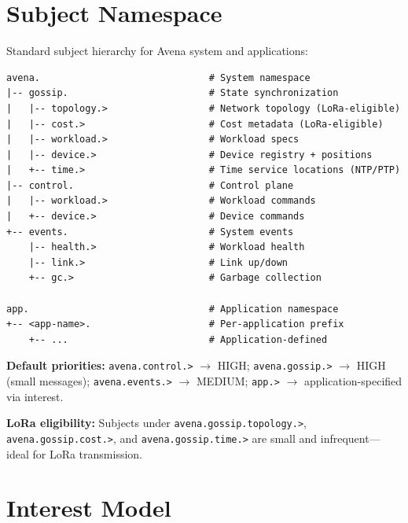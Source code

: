 
\section{Subject Namespace}
\label{sec:subjects}

Standard subject hierarchy for Avena system and applications:

\begin{Verbatim}[frame=single,fontsize=\small]
avena.                              # System namespace
|-- gossip.                         # State synchronization
|   |-- topology.>                  # Network topology (LoRa-eligible)
|   |-- cost.>                      # Cost metadata (LoRa-eligible)
|   |-- workload.>                  # Workload specs
|   |-- device.>                    # Device registry + positions
|   +-- time.>                      # Time service locations (NTP/PTP)
|-- control.                        # Control plane
|   |-- workload.>                  # Workload commands
|   +-- device.>                    # Device commands
+-- events.                         # System events
    |-- health.>                    # Workload health
    |-- link.>                      # Link up/down
    +-- gc.>                        # Garbage collection

app.                                # Application namespace
+-- <app-name>.                     # Per-application prefix
    +-- ...                         # Application-defined
\end{Verbatim}

\textbf{Default priorities:} \texttt{avena.control.>} $\rightarrow$ HIGH; \texttt{avena.gossip.>} $\rightarrow$ HIGH (small messages); \texttt{avena.events.>} $\rightarrow$ MEDIUM; \texttt{app.>} $\rightarrow$ application-specified via interest.

\textbf{LoRa eligibility:} Subjects under \texttt{avena.gossip.topology.>}, \texttt{avena.gossip.cost.>}, and \texttt{avena.gossip.time.>} are small and infrequent---ideal for LoRa transmission.

\section{Interest Model}

